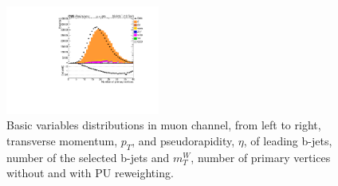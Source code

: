 \begin{figure}
  \includegraphics[width=0.45\textwidth]{fig/app4/muon/EvtInfo_NumVtx_w.pdf}
  \caption{Basic variables distributions in muon channel, from left to right, transverse momentum, $p_{T}$, and pseudorapidity, $\eta$, of leading b-jets, number of the selected b-jets and $m_{T}^{W}$, number of primary vertices without and with PU reweighting.}
  \label{Fig:DataMCMuon2}
  \end{figure}


